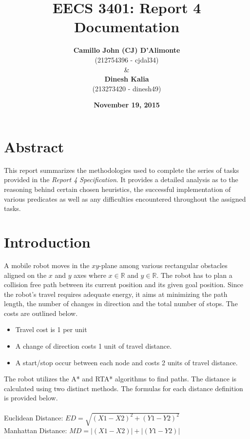 \documentclass[11pt]{article}
\newcommand{\forceindent}{\leavevmode{\parindent=1em\indent}}
\begin{document}
\title{\textbf{EECS 3401: Report 4 Documentation}}
\author{\textbf{Camillo John (CJ) D'Alimonte}\\ (212754396 - cjdal34) \\
\& \\
\textbf{Dinesh Kalia}\\ (213273420 - dinesh49)}
\date {\textbf{November 19, 2015}}
\maketitle

\tableofcontents
\newpage

\section{Abstract}
\forceindent This report summarizes the methodologies used to complete the series of tasks provided in the \emph{Report 4 Specification}. It provides a detailed analysis as to the reasoning behind certain chosen heuristics, the successful implementation of various predicates as well as any difficulties encountered throughout the assigned tasks.
\section{Introduction}
\forceindent A mobile robot moves in the $xy$\nobreakdash-plane among various rectangular obstacles aligned on the $x$ and $y$ axes where $x \in \mathbb{R}$ and $y \in \mathbb{R}$. The robot has to plan a collision free path between its current position and its given goal position. Since the robot's travel requires adequate energy, it aims at minimizing the path length, the number of changes in direction and the total number of stops. The costs are outlined below.
\begin{itemize}
\item Travel cost is 1 per unit
\item A change of direction costs 1 unit of travel distance.
\item A start/stop occur between each node and costs 2 units of travel distance. 
\end{itemize} 
\forceindent The robot utilizes the A* and RTA* algorithms to find paths. The distance is calculated using two distinct methods. The formulas for each distance definition is provided below.\\ 
\\
Euclidean Distance: $ED = \sqrt{(X1-X2)^2+(Y1-Y2)^2}$ \\
Manhattan Distance: $MD = |(X1-X2)| + |(Y1-Y2)|$ 
\end{document}
